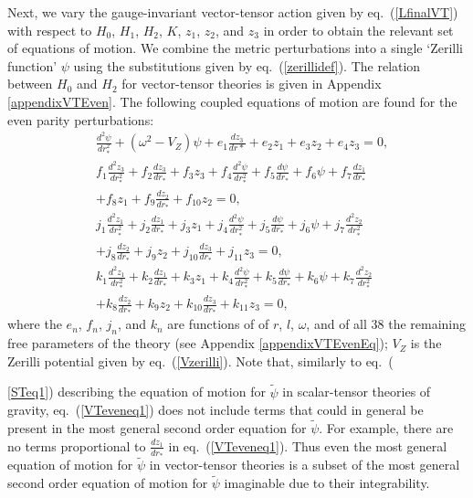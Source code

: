 \documentclass[10pt,twocolumn,preprintnumbers,amsmath,amssymb,nofootinbib
,superscriptaddress]{revtex4-1}
\begin{document}
{{Next, we vary the gauge-invariant vector-tensor action given by eq.~(\ref{LfinalVT}) with respect to $H_0$, $H_1$, $H_2$, $K$, $z_1$, $z_2$, and $z_3$ in order to obtain the relevant set of equations of motion. We combine the metric perturbations into a single `Zerilli function' $\psi$ using the substitutions given by eq.~(\ref{zerillidef}). The relation between $H_0$ and $H_2$ for vector-tensor theories is given in Appendix \ref{appendixVTEven}. The following coupled equations of motion are found for the even parity perturbations:
\begin{align}
&\frac{d^2\psi}{dr_\ast^2}+\left(\omega^2-V_Z\right)\psi+e_1\frac{dz_3}{dr\ast}+e_2z_1+e_3z_2+e_4z_3=0, \label{VTeveneq1}\\
&f_1\frac{d^2z_3}{dr_\ast^2}+f_2\frac{dz_3}{dr_\ast}+f_3z_3+f_4\frac{d^2\psi}{dr_\ast^2}+f_5\frac{d\psi}{dr_\ast}+f_6\psi+f_7\frac{dz_1}{dr_\ast}\nonumber\\
&+f_8z_1+f_9\frac{dz_2}{dr_\ast}+f_{10}z_2=0, \label{VTeveneq2}\\
&j_1\frac{d^2z_1}{dr_\ast^2}+j_2\frac{dz_1}{dr_\ast}+j_3z_1+j_4\frac{d^2\psi}{dr_\ast^2}+j_5\frac{d\psi}{dr_\ast}+j_6\psi+j_7\frac{d^2z_2}{dr_\ast^2}\nonumber\\
&+j_8\frac{dz_2}{dr_\ast}+j_9z_2+j_{10}\frac{dz_3}{dr_\ast}+j_{11}z_3=0, \label{VTeveneq3}\\
&k_1\frac{d^2z_1}{dr_\ast^2}+k_2\frac{dz_1}{dr_\ast}+k_3z_1+k_4\frac{d^2\psi}{dr_\ast^2}+k_5\frac{d\psi}{dr_\ast}+k_6\psi+k_7\frac{d^2z_2}{dr_\ast^2}\nonumber\\
&+k_8\frac{dz_2}{dr_\ast}+k_9z_2+k_{10}\frac{dz_3}{dr_\ast}+k_{11}z_3=0\label{VTeveneq4},
\end{align}
where the $e_n$, $f_n$, $j_n$, and $k_n$ are functions of of $r$, $l$, $\omega$, and of all 38 the remaining free parameters of the theory (see Appendix \ref{appendixVTEvenEq}); $V_Z$ is the Zerilli potential given by eq.~(\ref{Vzerilli}). Note that, similarly to eq.~({\ref{STeq1}) describing the equation of motion for $\tilde{\psi}$ in scalar-tensor theories of gravity, eq.~(\ref{VTeveneq1}) does not include terms that could in general be present in the most general second order equation for $\tilde{\psi}$. For example, there are no terms proportional to $\frac{dz_1}{dr_\ast}$ in eq.~(\ref{VTeveneq1}). Thus even the most general equation of motion for $\tilde{\psi}$ in vector-tensor theories is a subset of the most general second order equation of motion for $\tilde{\psi}$ imaginable due to their integrability.

}}}
\end{document}

